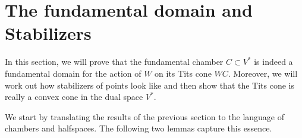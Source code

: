 \section{The fundamental domain and Stabilizers}

In this section, we will prove that the fundamental chamber \(C\subset V^*\) is indeed a fundamental domain for the action of \(W\) on its Tits cone \(WC\).
Moreover, we will work out how stabilizers of points look like and then show that the Tits cone is really a convex cone in the dual space \(V^*\).


We start by translating the results of the previous section to the language of chambers and halfspaces.
The following two lemmas capture this essence.

